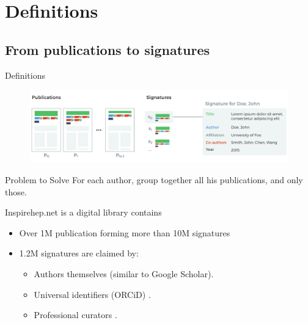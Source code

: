 \documentclass{beamer}
\begin{document}



\section{Definitions}

\subsection{From publications to signatures}

\begin{frame} {Definitions}

\begin{figure}
   \centering
   \includegraphics[width=\textwidth]{./figures/fig-pub-to-signature.pdf}
\end{figure}

\end{frame}




\begin{frame}{Problem to Solve}
For each author, group together all his publications, and only those.

\begin{block}{Inspirehep.net is a digital library contains}
\begin{itemize}
\item  Over 1M publication forming more than 10M signatures
\item  1.2M signatures are claimed by:\\[1em]
\begin{itemize}
\item Authors themselves (similar to Google Scholar). \\[1em]
\item Universal identifiers (ORCiD) . \\[1em]
\item Professional curators . \\[1em]
\end{itemize}
\end{itemize}
\end{block}
\end{frame}
\end{document}

